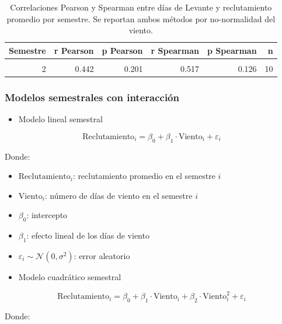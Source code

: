 \documentclass[
]{article}
\providecommand{\tightlist}{%
  \setlength{\itemsep}{0pt}\setlength{\parskip}{0pt}}
\begin{document}
\begin{table}[!h]
\centering
\caption{\label{tab:unnamed-chunk-8}Correlaciones Pearson y Spearman entre días de Levante y reclutamiento promedio por semestre. Se reportan ambos métodos por no-normalidad del viento.}
\centering
\begin{tabular}[t]{r|r|r|r|r|r}
\hline
Semestre & r Pearson & p Pearson & r Spearman & p Spearman & n\\
\hline
\cellcolor{gray!10}{1} & \cellcolor{gray!10}{-0.405} & \cellcolor{gray!10}{0.245} & \cellcolor{gray!10}{-0.377} & \cellcolor{gray!10}{0.283} & \cellcolor{gray!10}{10}\\
\hline
2 & 0.442 & 0.201 & 0.517 & 0.126 & 10\\
\hline
\end{tabular}
\end{table}

\newpage

\subsubsection{Modelos semestrales con interacción}\label{modelos-semestrales-con-interacciuxf3n}

\begin{itemize}
\tightlist
\item
  Modelo lineal semestral
\end{itemize}

\[
\text{Reclutamiento}_i = \beta_0 + \beta_1 \cdot \text{Viento}_i + \varepsilon_i
\]

Donde:

\begin{itemize}
\item
  \(\text{Reclutamiento}_i\): reclutamiento promedio en el semestre \(i\)
\item
  \(\text{Viento}_i\): número de días de viento en el semestre \(i\)
\item
  \(\beta_0\): intercepto
\item
  \(\beta_1\): efecto lineal de los días de viento
\item
  \(\varepsilon_i \sim \mathcal{N}(0, \sigma^2)\): error aleatorio
\item
  Modelo cuadrático semestral
\end{itemize}

\[
\text{Reclutamiento}_i = \beta_0 + \beta_1 \cdot \text{Viento}_i + \beta_2 \cdot \text{Viento}_i^2 + \varepsilon_i
\]

Donde:
\end{document}
